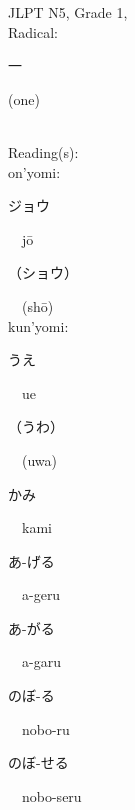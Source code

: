 \begin{multicols}{2}
{JLPT N5, Grade 1, \\Radical:\ \ {\begin{CJK}{UTF8}{min} 一 \end{CJK}} (one) } \\
Reading(s):\ \ \\
{\hspace*{1em}}on'yomi:\ \ \\
{\hspace*{2em}}{\begin{CJK}{UTF8}{min} ジョウ \end{CJK}}\ \ j\=o\ \ \\
{\hspace*{2em}}{\begin{CJK}{UTF8}{min} （ショウ） \end{CJK}}\ \ (sh\=o)\ \ \\
{\hspace*{1em}}kun'yomi:\ \ \\
{\hspace*{2em}}{\begin{CJK}{UTF8}{min} うえ \end{CJK}}\ \ ue\ \ \\
{\hspace*{2em}}{\begin{CJK}{UTF8}{min} （うわ） \end{CJK}}\ \ (uwa)\ \ \\
{\hspace*{2em}}{\begin{CJK}{UTF8}{min} かみ \end{CJK}}\ \ kami\ \ \\
{\hspace*{2em}}{\begin{CJK}{UTF8}{min} あ-げる \end{CJK}}\ \ a-geru\ \ \\
{\hspace*{2em}}{\begin{CJK}{UTF8}{min} あ-がる \end{CJK}}\ \ a-garu\ \ \\
{\hspace*{2em}}{\begin{CJK}{UTF8}{min} のぼ-る \end{CJK}}\ \ nobo-ru\ \ \\
{\hspace*{2em}}{\begin{CJK}{UTF8}{min} のぼ-せる \end{CJK}}\ \ nobo-seru\ \ \\

\end{multicols}
